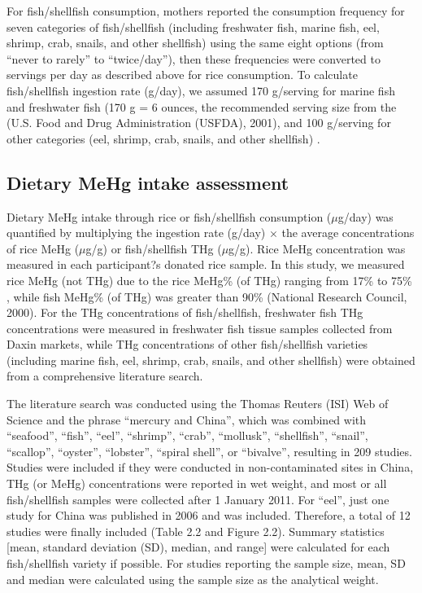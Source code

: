 For fish/shellfish consumption, mothers reported the consumption frequency for seven categories of fish/shellfish (including freshwater fish, marine fish, eel, shrimp, crab, snails, and other shellfish) using the same eight options (from ``never to rarely'' to ``twice/day''), then these frequencies were converted to servings per day as described above for rice consumption. To calculate fish/shellfish ingestion rate (g/day), we assumed 170 g/serving for marine fish and freshwater fish (170 g = 6 ounces, the recommended serving size from the (U.S. Food and Drug Administration (USFDA), 2001), and 100 g/serving for other categories (eel, shrimp, crab, snails, and other shellfish) \citep{cheng2009assessment}. 

\subsection{Dietary MeHg intake assessment}

Dietary MeHg intake through rice or fish/shellfish consumption (\({\mu}\)g/day) was quantified by multiplying the ingestion rate (g/day) \({\times}\) the average concentrations of rice MeHg (\({\mu}\)g/g) or fish/shellfish THg (\({\mu}\)g/g). Rice MeHg concentration was measured in each participant?s donated rice sample. In this study, we measured rice MeHg (not THg) due to the rice MeHg\% (of THg) ranging from 17\% to 75\% \cite{rothenberg2014rice}, while fish MeHg\% (of THg) was greater than 90\% (National Research Council, 2000). For the THg concentrations of fish/shellfish, freshwater fish THg concentrations were measured in freshwater fish tissue samples collected from Daxin markets, while THg concentrations of other fish/shellfish varieties (including marine fish, eel, shrimp, crab, snails, and other shellfish) were obtained from a comprehensive literature search. 

The literature search was conducted using the Thomas Reuters (ISI) Web of Science and the phrase ``mercury and China'', which was combined with ``seafood'', ``fish'', ``eel'', ``shrimp'', ``crab'', ``mollusk'', ``shellfish'', ``snail'', ``scallop'', ``oyster'', ``lobster'', ``spiral shell'', or ``bivalve'', resulting in 209 studies. Studies were included if they were conducted in non-contaminated sites in China, THg (or MeHg) concentrations were reported in wet weight, and most or all fish/shellfish samples were collected after 1 January 2011. For ``eel'', just one study for China was published in 2006 and was included. Therefore, a total of 12 studies were finally included (Table 2.2 and Figure 2.2). Summary statistics [mean, standard deviation (SD), median, and range] were calculated for each fish/shellfish variety if possible. For studies reporting the sample size, mean, SD and median were calculated using the sample size as the analytical weight. 

